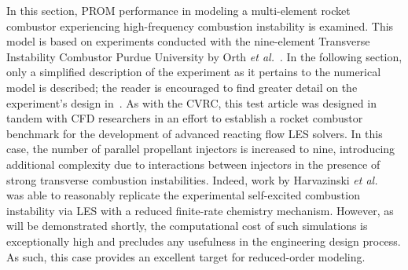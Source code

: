 

In this section, PROM performance in modeling a multi-element rocket combustor experiencing high-frequency combustion instability is examined. This model is based on experiments conducted with the nine-element Transverse Instability Combustor Purdue University by Orth \textit{et al.}~\cite{Orth2018}. In the following section, only a simplified description of the experiment as it pertains to the numerical model is described; the reader is encouraged to find greater detail on the experiment's design in~\cite{Orth2018}. As with the CVRC, this test article was designed in tandem with CFD researchers in an effort to establish a rocket combustor benchmark for the development of advanced reacting flow LES solvers. In this case, the number of parallel propellant injectors is increased to nine, introducing additional complexity due to interactions between injectors in the presence of strong transverse combustion instabilities. Indeed, work by Harvazinski \textit{et al.}~\cite{Harvazinski2019} was able to reasonably replicate the experimental self-excited combustion instability via LES with a reduced finite-rate chemistry mechanism. However, as will be demonstrated shortly, the computational cost of such simulations is exceptionally high and precludes any usefulness in the engineering design process. As such, this case provides an excellent target for reduced-order modeling.

